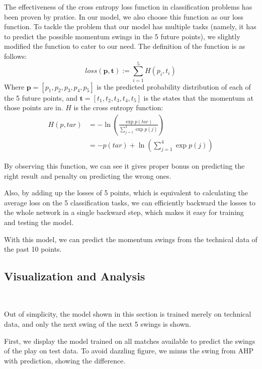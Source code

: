 The effectiveness of the cross entropy loss function in classification problems has been proven by pratice. In our model, we also choose this function as our loss function. To tackle the problem that our model has multiple tasks (namely,  it has to predict the possible momentum swings in the 5 future points), we slightly modified the function to cater to our need. The definition of the function is as follows:
\begin{equation}
    loss(\boldsymbol{p}, \boldsymbol{t}) := \sum_{i = 1}^5 H(p_i, t_i)
\end{equation}
Where $\boldsymbol{p} = [p_1, p_2, p_3, p_4, p_5]$ is the predicted probability distribution of each of the 5 future points, and $\boldsymbol{t} = [t_1, t_2, t_3, t_4, t_5]$ is the states that the momentum at those points are in. $H$ is the cross entropy function:
\begin{equation}
    \left.
        \begin{aligned}
        H(p, tar) &= -\ln (\frac{\exp p(tar)}{\sum_{j = 1}^{4} \exp p(j)}) \\
         &= -p(tar) + \ln(\sum_{j = 1}^{4} \exp p(j))
        \end{aligned}
    \right.
\end{equation}

By observing this function, we can see it gives proper bonus on predicting the right result and penalty on predicting the wrong ones.

Also, by adding up the losses of 5 points, which is equivalent to calculating the average loss on the 5 classification tasks, we can efficiently backward the losses to the whole network in a single backward step, which makes it easy for training and testing the model.

With this model, we can predict the momentum swings from the technical data of the past 10 points.

\subsection{Visualization and Analysis}~{}

Out of simplicity, the model shown in this section is trained merely on technical data,
and only the next swing of the next 5 swings is shown.

First, we display the model trained on all matches available to 
predict the swings of the play on test data.
To avoid dazzling figure, we minus the swing from AHP with prediction, showing the difference.

